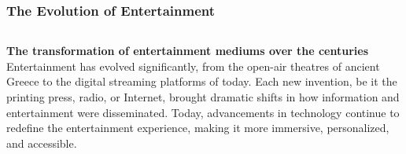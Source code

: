 \documentclass[5pt]{beamer}
\begin{document}
\begin{frame}
\frametitle{The Evolution of Entertainment}
\begin{columns}
\begin{column}{0.7\textwidth}
\begin{block}{\textbf{The transformation of entertainment mediums over the centuries}}
Entertainment has evolved significantly, from the open-air theatres of ancient Greece to the digital streaming platforms of today. Each new invention, be it the printing press, radio, or Internet, brought dramatic shifts in how information and entertainment were disseminated. Today, advancements in technology continue to redefine the entertainment experience, making it more immersive, personalized, and accessible.
\end{block}
\end{column}
\end{columns}
\end{frame}
\end{document}
